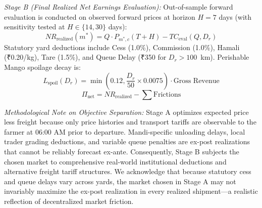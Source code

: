 \documentclass[journal]{IEEEtran}
\begin{document}
\textit{Stage B (Final Realized Net Earnings Evaluation):} Out-of-sample forward evaluation is conducted on observed forward prices at horizon $H = 7$ days (with sensitivity tested at $H \in \{14, 30\}$ days):
\begin{equation}
NR_{\text{realized}}(m^*) = Q \cdot P_{m^*,c}(T+H) - TC_{\text{eval}}(Q, D_r)
\end{equation}
Statutory yard deductions include Cess (1.0\%), Commission (1.0\%), Hamali (₹0.20/kg), Tare (1.5\%), and Queue Delay (₹350 for $D_r > 100$~km). Perishable Mango spoilage decay is:
\begin{equation}
L_{\text{spoil}}(D_r) = \min\left(0.12, \frac{D_r}{50} \times 0.0075\right) \cdot \text{Gross Revenue}
\end{equation}
\begin{equation}
\Pi_{\text{net}} = NR_{\text{realized}} - \sum \text{Frictions}
\end{equation}

\textit{Methodological Note on Objective Separation:} Stage A optimizes expected price less freight because only price histories and transport tariffs are observable to the farmer at 06:00 AM prior to departure. Mandi-specific unloading delays, local trader grading deductions, and variable queue penalties are ex-post realizations that cannot be reliably forecast ex-ante. Consequently, Stage B subjects the chosen market to comprehensive real-world institutional deductions and alternative freight tariff structures. We acknowledge that because statutory cess and queue delays vary across yards, the market chosen in Stage A may not invariably maximize the ex-post realization in every realized shipment---a realistic reflection of decentralized market friction.
\end{document}
